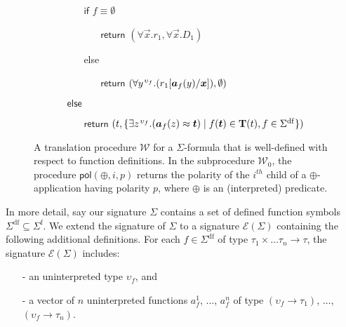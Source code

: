 \documentclass[runningheads,a4paper]{llncs}
\newcommand{\con}[1]{\mathsf{#1}}
\newcommand{\teq}{\approx}
\newcommand{\terms}{\mathbf{T}}
\newcommand{\conv}{\mathcal{W}}
\newcommand{\sfuns}[1]{#1^\mathrm{f}}
\newcommand{\sfundefs}[1]{#1^\mathrm{df}}
\newcommand{\pol}{\con{pol}}
\newcommand{\boolop}{\oplus}
\newcommand{\fnull}{\emptyset}
\newcommand{\farg}[1]{a_{#1}}
\newcommand{\vecfarg}[1]{\vec{a}_{#1}}
\newcommand{\fargsort}[1]{\upsilon_{#1}}
\newcommand{\extendsig}[1]{\mathcal{E}( #1 )}
\newcommand{\vthinspace}{\kern+0.083333em}
\newcommand{\typ}[1]{^{\vthinspace #1}}
\begin{document}
\begin{figure}[t]
\begin{enumerate}
\begin{itemize}
\begin{itemize}
      \item[] $\mathsf{if}$ $f \equiv \fnull$
      \begin{itemize}
        \item[] $\mathsf{return}$ $( \forall \vec x. r_1, \forall \vec x. D_1 )$
      \end{itemize}
      \item[] else
      \begin{itemize}
        \item[] $\mathsf{return}$ $( \forall y\typ{\fargsort{f}}. ( r_1 [ \vecfarg{f}( y ) / \vec x ] ), \emptyset )$
      \end{itemize}
    \end{itemize}
   \item[] $\mathsf{else}$
   \begin{itemize}
     \item[] $\mathsf{return}$ $( t, \{ \exists z\typ{\fargsort{f}}. ( \vecfarg{f}( z ) \teq \vec t ) \mid f( \vec t ) \in \terms( t ), f \in \sfundefs{\Sigma} \} )$
   \end{itemize}
 \end{itemize}
\end{enumerate}
\vspace{-2ex}
\caption{A translation procedure $\conv$ for a $\Sigma$-formula that is well-defined with respect to function definitions.
In the subprocedure $\conv_0$, the procedure $\pol( \boolop, i, p )$ returns the polarity of the $i^{th}$ child of a $\boolop$-application having polarity $p$,
where $\boolop$ is an (interpreted) predicate.
}
\label{fig:encoding}
\end{figure}

In more detail, 
say our signature $\Sigma$ contains a set of defined function symbols $\sfundefs{\Sigma} \subseteq \sfuns{\Sigma}$.
We extend the signature of $\Sigma$ to a signature $\extendsig{\Sigma}$ containing the following additional definitions.
For each $f \in \sfundefs{\Sigma}$ of type $\tau_1 \times \ldots \tau_n \rightarrow \tau$, 
the signature $\extendsig{\Sigma}$ includes:
\begin{enumerate}
\item[-] an uninterpreted type $\fargsort{f}$, and
\item[-] a vector of $n$ uninterpreted functions $\farg{f}^1$, $\ldots$, $\farg{f}^n$ of type $(\fargsort{f} \rightarrow \tau_1)$, $\ldots$, $(\fargsort{f} \rightarrow \tau_n)$.
\end{enumerate}
\end{document}
